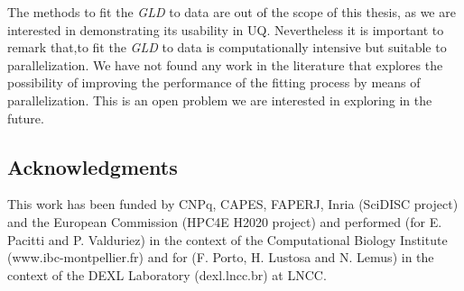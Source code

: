 The methods to fit the \textit{GLD} to data are out of the scope of this thesis, as we are interested in demonstrating its usability in UQ. Nevertheless it is important to remark that,to fit the \textit{GLD} to data is computationally intensive but suitable to parallelization. We have  not found any work in the literature that explores the possibility of improving the performance of the fitting process by means of parallelization. This is an open problem we are interested in exploring in the future.


\subsection*{Acknowledgments}
This work has been funded by CNPq, CAPES, FAPERJ, Inria (SciDISC project) and the European Commission (HPC4E H2020 project) and performed (for E. Pacitti and P. Valduriez) in the context of the Computational Biology Institute (www.ibc-montpellier.fr) and for (F. Porto, H. Lustosa and N. Lemus) in the context of the DEXL Laboratory (dexl.lncc.br)  at LNCC.

